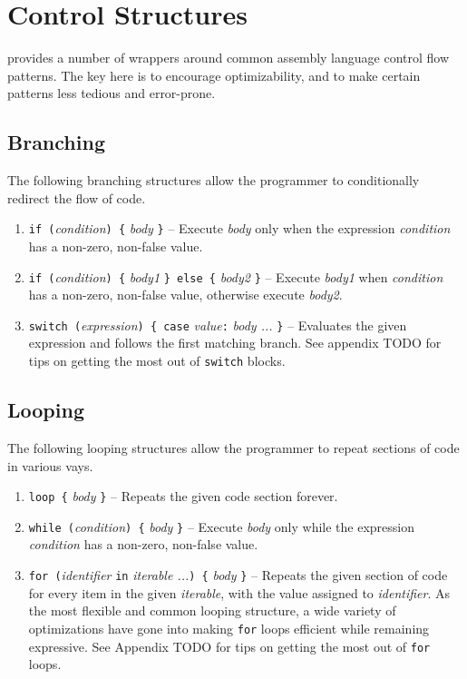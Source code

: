 \section{Control Structures}

\gx{} provides a number of wrappers around common assembly language
control flow patterns. The key here is to encourage optimizability,
and to make certain patterns less tedious and error-prone.

\subsection{Branching}

The following branching structures allow the programmer to conditionally
redirect the flow of code.

\begin{enumerate}

\item {\tt if (}{\em condition}{\tt ) \{} {\em body} {\tt \}} -- Execute
{\em body} only when the expression {\em condition} has a non-zero,
non-false value.

\item {\tt if (}{\em condition}{\tt ) \{} {\em body1} {\tt \} else \{}
{\em body2} {\tt \}} -- Execute {\em body1} when {\em condition} has a
non-zero, non-false value, otherwise execute {\em body2}.

\item {\tt switch (}{\em expression}{\tt ) \{ case} {\em value}{\tt :}
{\em body ...} {\tt \}} -- Evaluates the given expression and follows
the first matching branch. See appendix TODO for tips on getting the
most out of {\tt switch} blocks.

\end{enumerate}

\subsection{Looping}

The following looping structures allow the programmer to repeat sections
of code in various vays.

\begin{enumerate}

\item {\tt loop \{} {\em body} {\tt \}} -- Repeats the given code
section forever.

\item {\tt while (}{\em condition}{\tt ) \{} {\em body} {\tt \}} --
Execute {\em body} only while the expression {\em condition} has a
non-zero, non-false value.

\item {\tt for (}{\em identifier} {\tt in} {\em iterable ...}{\tt ) \{}
{\em body} {\tt \}} -- Repeats the given section of code for every item
in the given {\em iterable}, with the value assigned to {\em identifier}.
As the most flexible and common looping structure, a wide variety of
optimizations have gone into making {\tt for} loops efficient while
remaining expressive. See Appendix TODO for tips on getting the most
out of {\tt for} loops.

\end{enumerate}
